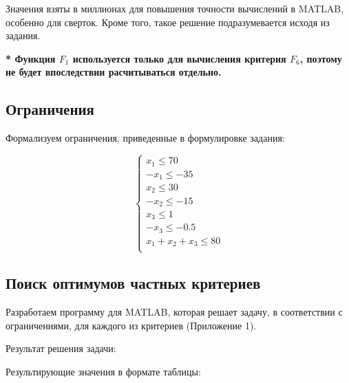 Значения взяты в миллионах для повышения точности вычислений в MATLAB, особенно для сверток. Кроме того, такое решение подразумевается исходя из задания.

\textbf{* Функция $F_1$ используется только для вычисления критерия $F_6$, поэтому не будет впоследствии расчитываться отдельно.}

\subsection{Ограничения}

Формализуем ограничения, приведенные в формулировке задания:

\begin{equation*}
\begin{cases}
\text{$x_1\leq 70$} \\
\text{$-x_1\leq -35$} \\
\text{$x_2\leq 30$} \\
\text{$-x_2\leq -15$} \\
\text{$x_3\leq 1$} \\
\text{$-x_3\leq -0.5$} \\
\text{$x_1+x_2+x_3\leq 80$} \\
\end{cases}
\end{equation*}

\subsection{Поиск оптимумов частных критериев}

Разработаем программу для MATLAB, которая решает задачу, в соответствии с ограничениями, для каждого из критериев (Приложение 1).

Результат решения задачи:



Результирующие значения в формате таблицы:

